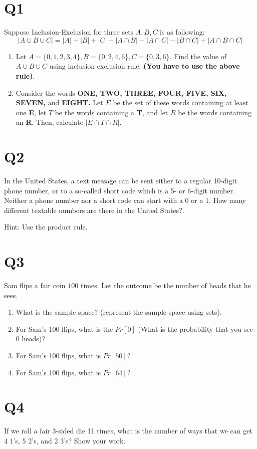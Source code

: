 \documentclass[12pt]{exam}
\begin{document}
\section{Q1}
Suppose Inclusion-Exclusion for three sets $A,B,C$ is as following:
\[|A \cup B \cup C| = |A| + |B| + |C| - |A \cap B | - |A \cap C| - |B \cap C| + |A \cap B \cap C|\]

\begin{enumerate}
    \item Let $A = \{0,1,2,3,4\}, B = \{0,2,4,6\}, C = \{0,3,6\}$. Find the value of $A \cup B \cup C$ using inclusion-exclusion rule. \textbf{(You have to use the above rule)}.
    \item Consider the words \textbf{ONE, TWO, THREE, FOUR, FIVE, SIX, SEVEN,} and \textbf{EIGHT.} Let $E$ be the set of these words containing at least one \textbf{E}, let $T$ be the words containing a \textbf{T}, and let $R$ be the words containing an \textbf{R}. Then, calculate $|E \cap T \cap R|$.
\end{enumerate}

\section{Q2} 
In the United States, a text message can be sent either to a regular 10-digit phone number, or to a so-called short code which is a 5- or 6-digit number. Neither a phone number nor a short code can start with a 0 or a 1. How many different textable numbers are there in the United States?.

Hint: Use the product rule.

\section{Q3}
Sam flips a fair coin $100$ times. Let the outcome be the number of heads that he sees.


\begin{enumerate}
    \item What is the sample space? (represent the sample space using sets).
    \item For Sam's 100 flips, what is the $Pr[0]$ (What is the probability that you see 0 heads)?
    \item For Sam's 100 flips, what is $Pr[50]$?
    \item For Sam's 100 flips, what is $Pr[64]$?
\end{enumerate}

\section{Q4}
If we roll a fair 3-sided die 11 times, what is the number of ways that we can get 4 1’s, 5 2’s, and 2 3’s? Show your work.
\end{document}
